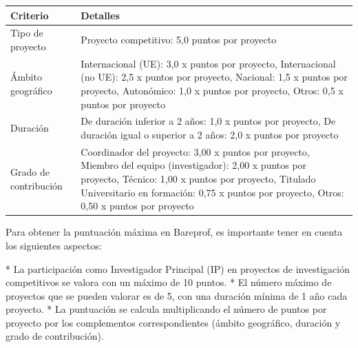 \documentclass{article}
\begin{document}
\begin{itemize}
\begin{itemize}
                        \vspace{0.4cm}
                        \begin{table}[h!]\centering\renewcommand{\arraystretch}{1.3}
                              \begin{tabular}{|p{}|p{}|}\hline
                                    Criterio              & Detalles                                                                                                                                                                                                                                                     \\\hline
                                    Tipo de proyecto      & Proyecto competitivo: 5,0 puntos por proyecto                                                                                                                                                                                                                \\\hline
                                    Ámbito geográfico     & Internacional (UE): 3,0 x puntos por proyecto, Internacional (no UE): 2,5 x puntos por proyecto, Nacional: 1,5 x puntos por proyecto, Autonómico: 1,0 x puntos por proyecto, Otros: 0,5 x puntos por proyecto                                                \\\hline
                                    Duración              & De duración inferior a 2 años: 1,0 x puntos por proyecto, De duración igual o superior a 2 años: 2,0 x puntos por proyecto                                                                                                                                   \\\hline
                                    Grado de contribución & Coordinador del proyecto: 3,00 x puntos por proyecto, Miembro del equipo (investigador): 2,00 x puntos por proyecto, Técnico: 1,00 x puntos por proyecto, Titulado Universitario en formación: 0,75 x puntos por proyecto, Otros: 0,50 x puntos por proyecto \\\hline
                              \end{tabular}\end{table}
                        \vspace{0.4cm}

                        Para obtener la puntuación máxima en Bareprof, es importante tener en cuenta los siguientes aspectos:

                        * La participación como Investigador Principal (IP) en proyectos de investigación competitivos se valora con un máximo de 10 puntos.
                        * El número máximo de proyectos que se pueden valorar es de 5, con una duración mínima de 1 año cada proyecto.
                        * La puntuación se calcula multiplicando el número de puntos por proyecto por los complementos correspondientes (ámbito geográfico, duración y grado de contribución).


\end{itemize}
\end{itemize}
\end{document}
